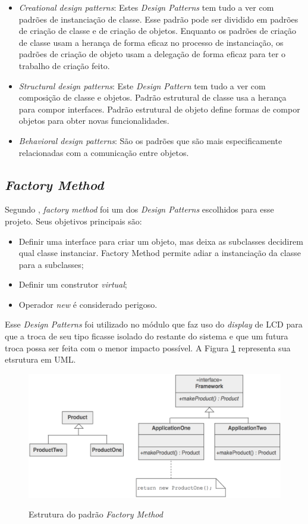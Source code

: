 \begin{itemize}
\item \emph{Creational design patterns}: Estes \emph{Design Patterns} tem tudo a ver com padrões de instanciação de classe. Esse padrão pode ser dividido em padrões de criação de classe e de criação de objetos. Enquanto os padrões de criação de classe usam a herança de forma eficaz no processo de instanciação, os padrões de criação de objeto usam a delegação de forma eficaz para ter o trabalho de criação feito. 
\item \emph{Structural design patterns}: Este \emph{Design Pattern} tem tudo a ver com composição de classe e objetos. Padrão estrutural de classe usa a herança para compor interfaces. Padrão estrutural de objeto define formas de compor objetos para obter novas funcionalidades.
\item \emph{Behavioral design patterns}: São os padrões que são mais especificamente relacionadas com a comunicação entre objetos.
\end{itemize}

\subsection{\emph{Factory Method}}
Segundo \cite{shalloway2004design}, \emph{factory method} foi um dos \emph{Design Patterns} escolhidos para esse projeto. Seus objetivos principais são:

\begin{itemize}
\item Definir uma interface para criar um objeto, mas deixa as subclasses decidirem qual classe instanciar. Factory Method permite adiar a instanciação da classe para a subclasses;
\item Definir um construtor \emph{virtual};
\item Operador \emph{new} é considerado perigoso.
\end{itemize}

Esse \emph{Design Patterns} foi utilizado no módulo que faz uso do \emph{display} de LCD para que a troca de seu tipo ficasse isolado do restante do sistema e que um futura troca possa ser feita com o menor impacto possível. A Figura \ref{fig:factorymethod} representa sua etsrutura em UML. \newpage

\begin{figure}[htp]
	\centering
	\includegraphics[scale=0.4]{images/Factory_Method.png}
	\caption{Estrutura do padrão \emph{Factory Method}}	
	\label{fig:factorymethod}
	\cite{shalloway2004design}
\end{figure}

